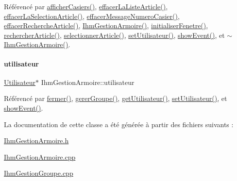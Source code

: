 Référencé par \hyperlink{class_ihm_gestion_armoire_a04201173bd9ac135227ac56a6c22a999}{afficher\+Casiers()}, \hyperlink{class_ihm_gestion_armoire_a65cf47ddfe3942435b5f3bf40578d96a}{effacer\+La\+Liste\+Article()}, \hyperlink{class_ihm_gestion_armoire_aa432c67c648097bbec288694077d83e6}{effacer\+La\+Selection\+Article()}, \hyperlink{class_ihm_gestion_armoire_a38dab807125ddb3baecf9345906e3c4b}{effacer\+Message\+Numero\+Casier()}, \hyperlink{class_ihm_gestion_armoire_a71c12ea50f463c14c835b02d3db22025}{effacer\+Recherche\+Article()}, \hyperlink{class_ihm_gestion_armoire_a7aa5e1514dd5d1b5648a2f6dd36970f9}{Ihm\+Gestion\+Armoire()}, \hyperlink{class_ihm_gestion_armoire_a3bd9b576cab980cae3dc591f412309fc}{initialiser\+Fenetre()}, \hyperlink{class_ihm_gestion_armoire_a594f25b58b70700e19e3e7f567325c40}{rechercher\+Article()}, \hyperlink{class_ihm_gestion_armoire_a28970b692994ad7201c03decd42ec0e5}{selectionner\+Article()}, \hyperlink{class_ihm_gestion_armoire_af63a0c4424edd90a3c45506dde527b4e}{set\+Utilisateur()}, \hyperlink{class_ihm_gestion_armoire_ad0f3d63f9b93fc902de40a9a546f709c}{show\+Event()}, et \hyperlink{class_ihm_gestion_armoire_a6d854653399972a013f79edfe32b04cb}{$\sim$\+Ihm\+Gestion\+Armoire()}.

\mbox{\label{class_ihm_gestion_armoire_aa14adf3863cf09947411fc33e413076c}} 
\paragraph{\texorpdfstring{utilisateur}{utilisateur}}
{\footnotesize\ttfamily \hyperlink{class_utilisateur}{Utilisateur}$\ast$ Ihm\+Gestion\+Armoire\+::utilisateur\hspace{0.3cm}{\ttfamily [private]}}



Référencé par \hyperlink{class_ihm_gestion_armoire_a7fef1d21e4dcce9c4550d33b15e8dc29}{fermer()}, \hyperlink{class_ihm_gestion_armoire_a4cd664c766e29593d3fedf2baea6a330}{gerer\+Groupe()}, \hyperlink{class_ihm_gestion_armoire_a024905507f9700b2afa794d7c357546f}{get\+Utilisateur()}, \hyperlink{class_ihm_gestion_armoire_af63a0c4424edd90a3c45506dde527b4e}{set\+Utilisateur()}, et \hyperlink{class_ihm_gestion_armoire_ad0f3d63f9b93fc902de40a9a546f709c}{show\+Event()}.



La documentation de cette classe a été générée à partir des fichiers suivants \+:\begin{DoxyCompactItemize}
\item 
\hyperlink{_ihm_gestion_armoire_8h}{Ihm\+Gestion\+Armoire.\+h}\item 
\hyperlink{_ihm_gestion_armoire_8cpp}{Ihm\+Gestion\+Armoire.\+cpp}\item 
\hyperlink{_ihm_gestion_groupe_8cpp}{Ihm\+Gestion\+Groupe.\+cpp}\end{DoxyCompactItemize}
